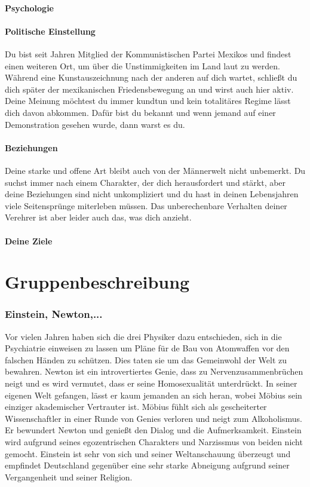 \documentclass[12pt, a4paper, openany]{report}
\begin{document}
\subsubsection{Psychologie}


\subsubsection{Politische Einstellung}
Du bist seit Jahren Mitglied der Kommunistischen Partei Mexikos und findest einen weiteren Ort, um über die Unstimmigkeiten im Land laut zu werden. Während eine Kunstauszeichnung nach der anderen auf dich wartet, schließt du dich später der mexikanischen Friedensbewegung an und wirst auch hier aktiv. Deine Meinung möchtest du immer kundtun und kein totalitäres Regime lässt dich davon abkommen. Dafür bist du bekannt und wenn jemand auf einer Demonstration gesehen wurde, dann warst es du.

\subsubsection{Beziehungen}
Deine starke und offene Art bleibt auch von der Männerwelt nicht unbemerkt. Du suchst immer nach einem Charakter, der dich herausfordert und stärkt, aber deine Beziehungen sind nicht unkompliziert und du hast in deinen Lebensjahren viele Seitensprünge miterleben müssen. Das unberechenbare Verhalten deiner Verehrer ist aber leider auch das, was dich anzieht. 

\subsubsection{Deine Ziele}


\chapter{Gruppenbeschreibung}

\subsection{Einstein, Newton,...}
Vor vielen Jahren haben sich die drei Physiker dazu entschieden, sich in die Psychiatrie einweisen zu lassen um Pläne für de Bau von Atomwaffen vor den falschen Händen zu schützen. 
Dies taten sie um das Gemeinwohl der Welt zu bewahren.
Newton ist ein introvertiertes Genie, dass zu Nervenzusammenbrüchen neigt und es wird vermutet, dass er seine Homosexualität unterdrückt. 
In seiner eigenen Welt gefangen, lässt er kaum jemanden an sich heran, wobei Möbius sein einziger akademischer Vertrauter ist. 
Möbius fühlt sich als gescheiterter Wissenschaftler in einer Runde von Genies verloren und neigt zum Alkoholismus. 
Er bewundert Newton und genießt den Dialog und die Aufmerksamkeit. 
Einstein wird aufgrund seines egozentrischen Charakters und Narzissmus von beiden nicht gemocht. 
Einstein ist sehr von sich und seiner Weltanschauung überzeugt und empfindet Deutschland gegenüber eine sehr starke Abneigung aufgrund seiner Vergangenheit und seiner Religion. 
\end{document}
